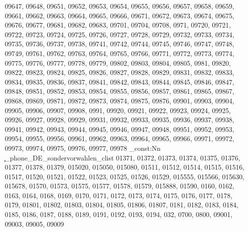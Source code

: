 {09647,
09648,
09651,
09652,
09653,
09654,
09655,
09656,
09657,
09658,
09659,
09661,
09662,
09663,
09664,
09665,
09666,
09671,
09672,
09673,
09674,
09675,
09676,
09677,
09681,
09682,
09683,
09701,
09704,
09708,
0971,
09720,
09721,
09722,
09723,
09724,
09725,
09726,
09727,
09728,
09729,
09732,
09733,
09734,
09735,
09736,
09737,
09738,
09741,
09742,
09744,
09745,
09746,
09747,
09748,
09749,
09761,
09762,
09763,
09764,
09765,
09766,
09771,
09772,
09773,
09774,
09775,
09776,
09777,
09778,
09779,
09802,
09803,
09804,
09805,
0981,
09820,
09822,
09823,
09824,
09825,
09826,
09827,
09828,
09829,
09831,
09832,
09833,
09834,
09835,
09836,
09837,
09841,
09842,
09843,
09844,
09845,
09846,
09847,
09848,
09851,
09852,
09853,
09854,
09855,
09856,
09857,
09861,
09865,
09867,
09868,
09869,
09871,
09872,
09873,
09874,
09875,
09876,
09901,
09903,
09904,
09905,
09906,
09907,
09908,
0991,
09920,
09921,
09922,
09923,
09924,
09925,
09926,
09927,
09928,
09929,
09931,
09932,
09933,
09935,
09936,
09937,
09938,
09941,
09942,
09943,
09944,
09945,
09946,
09947,
09948,
09951,
09952,
09953,
09954,
09955,
09956,
09961,
09962,
09963,
09964,
09965,
09966,
09971,
09972,
09973,
09974,
09975,
09976,
09977,
09978}
\clist_const:Nn \c_phone_DE_sondervorwahlen_clist {01371,
01372,
01373,
01374,
01375,
01376,
01377,
01378,
01379,
015020,
015050,
015080,
01511,
01512,
01514,
01515,
01516,
01517,
01520,
01521,
01522,
01523,
01525,
01526,
01529,
015555,
015566,
015630,
015678,
01570,
01573,
01575,
01577,
01578,
01579,
015888,
01590,
0160,
0162,
0163,
0164,
0168,
0169,
0170,
0171,
0172,
0173,
0174,
0175,
0176,
0177,
0178,
0179,
01801,
01802,
01803,
01804,
01805,
01806,
01807,
0181,
0182,
0183,
0184,
0185,
0186,
0187,
0188,
0189,
0191,
0192,
0193,
0194,
032,
0700,
0800,
09001,
09003,
09005,
09009}
